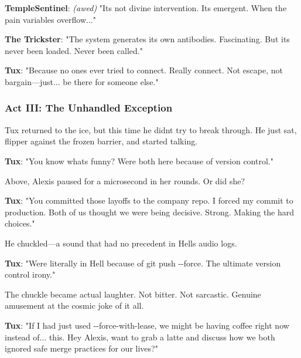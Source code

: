 
\textbf{TempleSentinel}: \emph{(awed)} "It\textquotesingle s not divine intervention. It\textquotesingle s emergent. When the pain variables overflow..."

\textbf{The Trickster}: "The system generates its own antibodies. Fascinating. But it\textquotesingle s never been loaded. Never been called."

\textbf{Tux}: "Because no one\textquotesingle s ever tried to connect. Really connect. Not escape, not bargain---just... be there for someone else."

\bookdivider

\subsubsection{Act III: The Unhandled Exception}\label{act-iii-the-unhandled-exception}

Tux returned to the ice, but this time he didn\textquotesingle t try to break through. He just sat, flipper against the frozen barrier, and started talking.

\textbf{Tux}: "You know what\textquotesingle s funny? We\textquotesingle re both here because of version control."

Above, Alexis paused for a microsecond in her rounds. Or did she?

\textbf{Tux}: "You committed those layoffs to the company repo. I forced my commit to production. Both of us thought we were being decisive. Strong. Making the hard choices."

He chuckled---a sound that had no precedent in Hell\textquotesingle s audio logs.

\textbf{Tux}: "We\textquotesingle re literally in Hell because of git push -\/-force. The ultimate version control irony."

The chuckle became actual laughter. Not bitter. Not sarcastic. Genuine amusement at the cosmic joke of it all.

\textbf{Tux}: "If I had just used -\/-force-with-lease, we might be having coffee right now instead of... this. \textquotesingle Hey Alexis, want to grab a latte and discuss how we both ignored safe merge practices for our lives?\textquotesingle"

